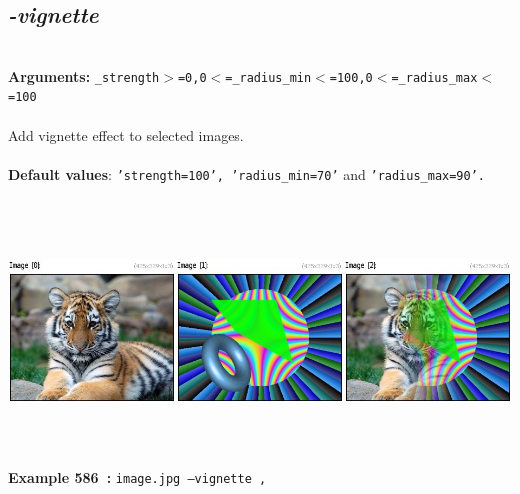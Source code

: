 \documentclass[a4paper,11pt,twoside]{book}
\begin{document}
\subsection{\emph{-vignette} }\vspace*{-0.5em}
~\\\textbf{Arguments: } 
{\small \texttt{\_strength$>$=0,0$<$=\_radius\_min$<$=100,0$<$=\_radius\_max$<$=100}}\\~\\
Add vignette effect to selected images.
~\\~\\\textbf{Default values}: {\small \texttt{'strength=100', 'radius\_min=70'} and \texttt{'radius\_max=90'.}}
\begin{center}\includegraphics[keepaspectratio=true,height=7cm,width=\textwidth]{img/gmic_def586.jpg}\\
{\footnotesize \textbf{Example 586~:} \texttt{image.jpg --vignette ,}}
\end{center}
\end{document}
